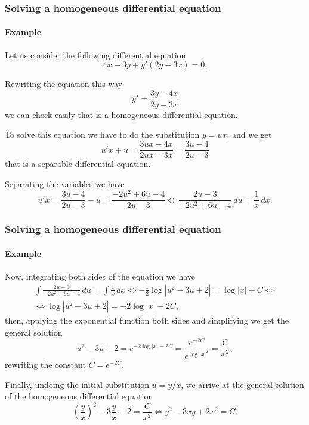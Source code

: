 \begin{frame}
\frametitle{Solving a homogeneous differential equation}
\framesubtitle{Example}
Let us consider the following differential equation
\[
4x-3y+y'(2y-3x)=0.
\]

Rewriting the equation this way
\[
y'=\frac{3y-4x}{2y-3x}
\]
we can check easily that is a homogeneous differential equation.

To solve this equation we have to do the substitution $y=ux$, and we get
\[
u'x+u=\frac{3ux-4x}{2ux-3x}=\frac{3u-4}{2u-3}
\]
that is a separable differential equation.

Separating the variables we have
\[
u'x=\frac{3u-4}{2u-3}-u=\frac{-2u^2+6u-4}{2u-3}\Leftrightarrow \frac{2u-3}{-2u^2+6u-4}\,du=\frac{1}{x}\,dx.
\]
\end{frame}


\begin{frame}
\frametitle{Solving a homogeneous differential equation}
\framesubtitle{Example}
Now, integrating both sides of the equation we have
\[
\renewcommand{\arraystretch}{2}
\begin{array}{c}
\displaystyle \int \frac{2u-3}{-2u^2+6u-4}\,du=\int \frac{1}{x}\,dx
\Leftrightarrow -\frac{1}{2}\log|u^2-3u+2|=\log|x|+C \Leftrightarrow\\
\Leftrightarrow \log|u^2-3u+2|=-2\log|x|-2C,
\end{array}
\]
then, applying the exponential function both sides and simplifying we get the general solution 
\[
u^2-3u+2=e^{-2\log|x|-2C}=\frac{e^{-2C}}{e^{\log|x|^2}}=\frac{C}{x^2},
\]
rewriting the constant $C=e^{-2C}$.

Finally, undoing the initial substitution $u=y/x$, we arrive at the general solution of the homogeneous differential equation
\[
\left(\frac{y}{x}\right)^2-3\frac{y}{x}+2=\frac{C}{x^2}\Leftrightarrow y^2-3xy+2x^2=C.
\]
\end{frame}



